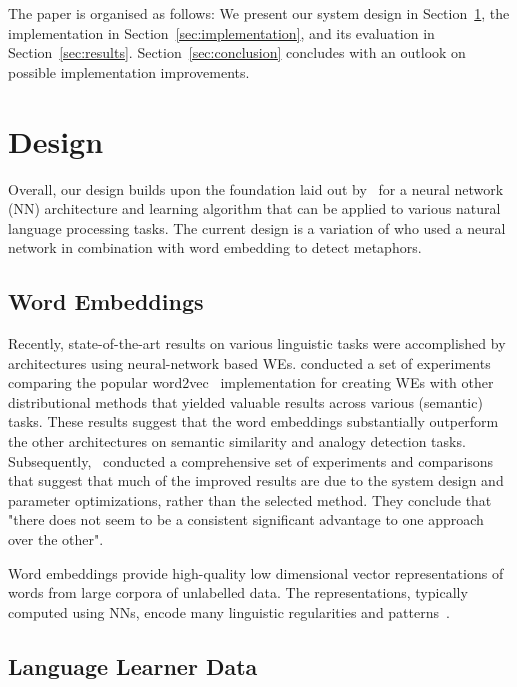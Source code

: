 \documentclass[11pt,a4paper]{article}
\begin{document}
The paper is organised as follows: We present our system design in
Section~\ref{sec:design}, the implementation in
Section~\ref{sec:implementation}, and its evaluation in
Section~\ref{sec:results}. 
Section~\ref{sec:conclusion} concludes with an outlook on possible
implementation improvements.

\section{Design} %
\label{sec:design}

Overall, our design builds upon the foundation
laid out by~ for a neural network (NN) architecture
and learning algorithm that can be applied to various natural language
processing tasks. The current design is a variation of \cite{W16-1104} who used a neural network in combination with word embedding to detect metaphors.

\subsection{Word Embeddings} %

Recently, state-of-the-art results on various linguistic tasks were
accomplished by architectures using neural-network based WEs.
 conducted a set of
experiments comparing the popular
word2vec~\cite{DBLP:journals/corr/abs-1301-3781,arXiv:1310.4546}
implementation for creating WEs with other distributional methods that yielded
valuable results across various (semantic) tasks. 
These results suggest that the word embeddings substantially
outperform the other architectures on semantic similarity and analogy
detection tasks.
Subsequently,~ conducted a comprehensive set of
experiments and comparisons that suggest that much of the improved results are
due to the system design and parameter optimizations, rather than the selected
method.  
They conclude that "there does not seem to be a consistent significant
advantage to one approach over the other".%

Word embeddings provide high-quality low dimensional vector representations of
words from large corpora of unlabelled data. The representations, typically
computed using NNs, encode many linguistic regularities and
patterns~\cite{arXiv:1310.4546}.


\subsection{Language Learner Data}
% 
\end{document}
